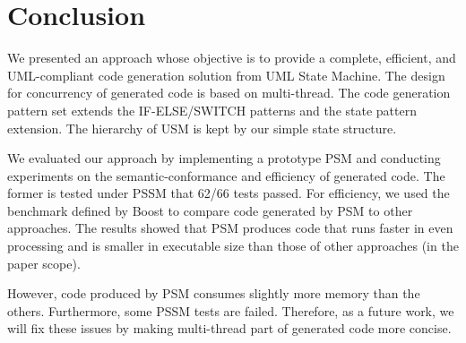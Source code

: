\section{Conclusion}
\label{sec:conclusion}
We presented an approach whose objective is to provide a complete, efficient, and UML-compliant code generation solution from UML State Machine. 
The design for concurrency of generated code is based on multi-thread.
The code generation pattern set extends the IF-ELSE/SWITCH patterns and the state pattern extension. 
The hierarchy of USM is kept by our simple state structure.

We evaluated our approach by implementing a prototype PSM and conducting experiments on the semantic-conformance and efficiency of generated code.
The former is tested under PSSM that 62/66 tests passed.
For efficiency, we used the benchmark defined by Boost to compare code generated by PSM to other approaches.
The results showed that PSM produces code that runs faster in even processing and is smaller in executable size than those of other approaches (in the paper scope).

However, code produced by PSM consumes slightly more memory than the others.
Furthermore, some PSSM tests are failed.
Therefore, as a future work, we will fix these issues by making multi-thread part of generated code more concise.  
 